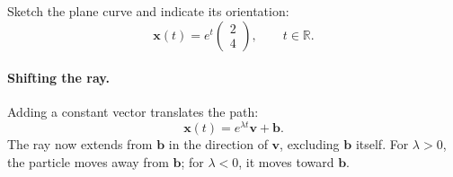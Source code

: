 \documentclass[11pt,letterpaper]{article}
\begin{document}
\begin{example}[4]{
Sketch the plane curve and indicate its orientation:
\[
\mathbf{x}(t)=e^t
\begin{pmatrix}2\\4\end{pmatrix},
\qquad t\in\mathbb R.
\]
}
\begin{center}
\end{center}
\end{example}

\paragraph{Shifting the ray.}
Adding a constant vector translates the path:
\[
\mathbf{x}(t)=e^{\lambda t}\mathbf{v}+\mathbf{b}.
\]
The ray now extends from $\mathbf{b}$ in the direction
of $\mathbf{v}$, excluding $\mathbf{b}$ itself.
For $\lambda>0$, the particle moves away from
$\mathbf{b}$; for $\lambda<0$, it moves toward
$\mathbf{b}$.
\end{document}
